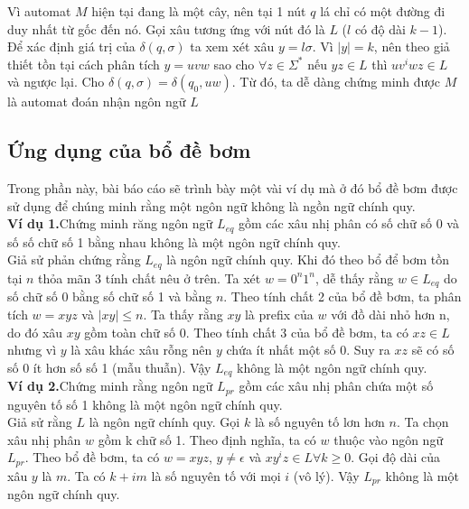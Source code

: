 \documentclass[14pt]{extreport}
\begin{document}
Vì automat $M$ hiện tại đang là một cây, nên tại 1 nút $q$ lá chỉ có một đường đi duy nhất từ gốc đến nó. Gọi xâu tương ứng với nút đó là $L$ ($l$ có độ dài $k-1$). Để xác định giá trị của $\delta(q, \sigma)$ ta xem xét xâu $y = l\sigma $. Vì $|y| = k$, nên theo giả thiết tồn tại cách phân tích $y = uvw$ sao cho $\forall z \in \Sigma^*$ nếu $yz \in L$ thì $uv^iwz \in L$ và ngược lại. Cho $\delta(q, \sigma) = \delta(q_0, uw)$. Từ đó, ta dễ dàng chứng minh được $M$ là automat đoán nhận ngôn ngữ $L$

\subsection{Ứng dụng của bổ đề bơm}
Trong phần này, bài báo cáo sẽ trình bày một vài ví dụ mà ở đó bổ đề bơm được sử dụng để chúng minh rằng một ngôn ngữ không là ngồn ngữ chính quy.\\

\textbf{Ví dụ 1.}Chứng minh răng ngôn ngữ $L_{eq}$ gồm các xâu nhị phân có số chữ số 0 và số số chữ số 1 bằng nhau không là một ngôn ngữ chính quy. \\
Giả sử phản chứng rằng $L_{eq}$ là ngôn ngữ chính quy. Khi đó theo bổ để bơm tồn tại $n$ thỏa mãn 3 tính chất nêu ở trên. Ta xét $w = 0^n 1^n$, dễ thấy rằng $w \in L_{eq}$ do số chữ số 0 bằng số chữ số 1 và bằng $n$. Theo tính chất 2 của bổ đề bơm, ta phân tích $w = xyz$ và $|xy| \leq n$. Ta thấy rằng $xy$ là prefix của $w$ với đồ dài nhỏ hơn n, do đó xâu $xy$ gồm toàn chữ số 0. Theo tính chất 3 của bổ đề bơm, ta có $xz \in L$ nhưng vì $y$ là xâu khác xâu rỗng nên $y$ chứa ít nhất một số 0. Suy ra $xz$ sẽ có số số 0 ít hơn số số 1 (mẫu thuẫn). Vậy $L_{eq}$ không là một ngôn ngữ chính quy.\\

\textbf{Ví dụ 2.}Chứng minh rằng ngôn ngữ $L_{pr}$ gồm các xâu nhị phân chứa một số nguyên tố số 1 không là một ngôn ngữ chính quy. \\
Giả sử rằng $L$ là ngôn ngữ chính quy. Gọi $k$ là số nguyên tố lơn hơn $n$. Ta chọn xâu nhị phân $w$ gồm k chữ số 1. Theo định nghĩa, ta có $w$ thuộc vào ngôn ngữ $L_{pr}$. Theo bổ đề bơm, ta có $w = xyz$, $y \neq \epsilon$ và $xy^iz \in L \forall k \geq 0$. Gọi độ dài của xâu $y$ là $m$. Ta có $k + im$ là số nguyên tố với mọi $i$ (vô lý). Vậy $L_{pr}$ không là một ngôn ngữ chính quy.
\end{document}
